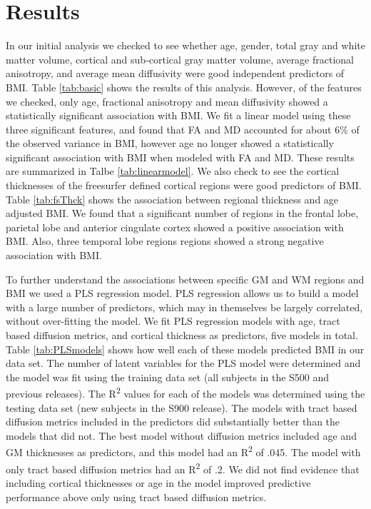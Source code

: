 \section{Results}

    In our initial analysis we checked to see whether age, gender, total gray and white matter volume, cortical and sub-cortical gray matter volume, average fractional anisotropy, and average mean diffusivity were good independent predictors of BMI. Table \ref{tab:basic} shows the results of this analysis. However, of the features we checked, only age, fractional anisotropy and mean diffusivity showed a statistically significant association with BMI. We fit a linear model using these three significant features, and found that FA and MD accounted for about 6\% of the observed variance in BMI, however age no longer showed a statistically significant association with BMI when modeled with FA and MD. These results are summarized in Talbe \ref{tab:linearmodel}. We also check to see the cortical thicknesses of the freesurfer defined cortical regions were good predictors of BMI. Table \ref{tab:fsThck} shows the association between regional thickness and age adjusted BMI. We found that a significant number of regions in the frontal lobe, parietal lobe and anterior cingulate cortex showed a positive association with BMI. Also, three temporal lobe regions regions showed a strong negative association with BMI.
    
    To further understand the associations between specific GM and WM regions and BMI we used a PLS regression model. PLS regression allows us to build a model with a large number of predictors, which may in themselves be largely correlated, without over-fitting the model. We fit PLS regression models with age, tract based diffusion metrics, and cortical thickness as predictors, five models in total. Table \ref{tab:PLSmodels} shows how well each of these models predicted BMI in our data set. The number of latent variables for the PLS model were determined and the model was fit using the training data set (all subjects in the S500 and previous releases). The R\textsuperscript{2} values for each of the models was determined using the testing data set (new subjects in the S900 release). The models with tract based diffusion metrics included in the predictors did substantially better than the models that did not. The best model without diffusion metrics included age and GM thicknesses as predictors, and this model had an R\textsuperscript{2} of .045. The model with only tract based diffusion metrics had an R\textsuperscript{2} of .2. We did not find evidence that including cortical thicknesses or age in the model improved predictive performance above only using tract based diffusion metrics.
    
